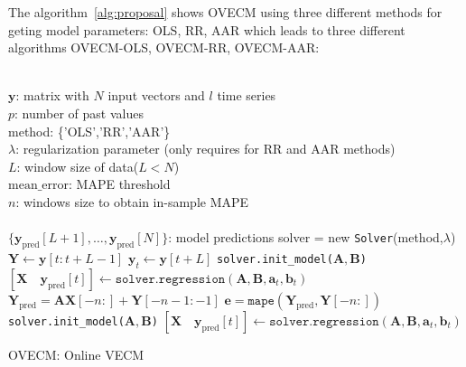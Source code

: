 
The algorithm~\ref{alg:proposal} shows OVECM using three different
methods for geting model parameters: OLS, RR, AAR which leads to three different
algorithms OVECM-OLS, OVECM-RR, OVECM-AAR:

\begin{algorithm}[ht]
\begin{algorithmic}[1]
\REQUIRE $\,$ \\
$\mathbf{y}$: matrix with $N$ input vectors and $l$ time series\\
$p$: number of past values \\
method: \{'OLS','RR','AAR'\} \\
$\lambda$: regularization parameter (only requires for RR and AAR methods) \\
$L$: window size of data($L<N$) \\
$\text{mean\_error}$: MAPE threshold \\
$n$: windows size to obtain in-sample MAPE \\
\ENSURE  $\,$ \\
$\{\mathbf{y}_{\text{pred}}[L+1],\dots, \mathbf{y}_{\text{pred}}[N]\}$: model predictions 
\STATE solver = new \texttt{Solver}(method,$\lambda$) \\
    \STATE $\mathbf{Y} \gets \mathbf{y}[t:t+L-1]$
    \STATE $\mathbf{y}_t \gets \mathbf{y}[t+L]$
        \STATE \texttt{solver.init\_model($\mathbf{A},\mathbf{B}$)} 
    \ENDIF
    \STATE $[\mathbf{X} \quad \mathbf{y}_{\text{pred}}[t]] \gets \texttt{solver.regression}
    (\mathbf{A},\mathbf{B},\mathbf{a}_t,\mathbf{b}_t)$
    \STATE $\mathbf{Y}_{\text{pred}} = \mathbf{AX}[-n:]+\mathbf{Y}[-n-1:-1]$
    \STATE $\mathbf{e} = \texttt{mape}(\mathbf{Y}_{\text{pred}},\mathbf{Y}[-n:])$
        \STATE \texttt{solver.init\_model($\mathbf{A},\mathbf{B}$)} 
        \STATE $[\mathbf{X} \quad \mathbf{y}_{\text{pred}}[t]] \gets \texttt{solver.regression}
        (\mathbf{A},\mathbf{B},\mathbf{a}_t,\mathbf{b}_t)$
    \ENDIF
{}
\ENDFOR
\end{algorithmic}
\caption{OVECM: Online VECM}
\label{alg:proposal}
\end{algorithm}

